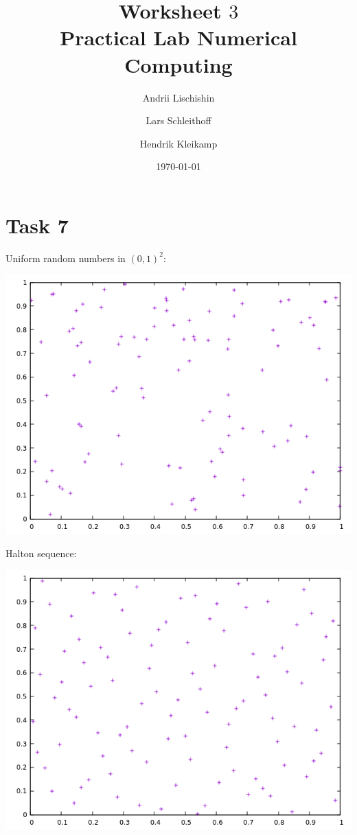\documentclass[10pt,a4paper]{article}
\begin{document}
\title{Worksheet $3$\\
\small{Practical Lab Numerical Computing}}
\author{Andrii Lischishin \and Lars Schleithoff \and Hendrik Kleikamp}
\date{\today}
\maketitle

\section*{Task 7}

Uniform random numbers in $(0,1)^2$:
\begin{center}
\includegraphics[scale=0.5]{uniform_random_numbers.png}		
\end{center}

Halton sequence:
\begin{center}
\includegraphics[scale=0.5]{halton_sequence.png}		
\end{center}
\end{document}
